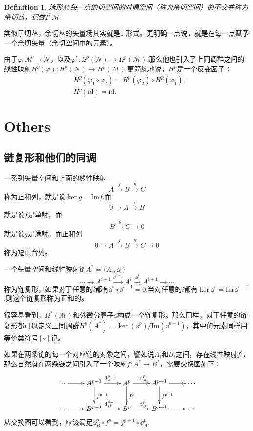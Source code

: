 \documentclass[11pt]{extbook}
\theoremstyle{plain}%
\newtheorem{defi}{Definition}[section]%
\begin{document}
\begin{defi}
流形$\mathcal{M}$每一点的切空间的对偶空间（称为余切空间）的不交并称为余切丛，记做$T^*\mathcal{M}$.
\end{defi}

类似于切丛，余切丛的矢量场其实就是1-形式。更明确一点说，就是在每一点赋予一个余切矢量（余切空间中的元素）。

由于$\varphi:\mathcal{M}\to\mathcal{N}$，以及$\varphi^*:\Omega^p(\mathcal{N})\to\Omega^p(\mathcal{M})$,那么他也引入了上同调群之间的线性映射$H^p(\varphi):H^p(\mathcal{N})\to H^p(\mathcal{M})$.更简练地说，$H^p$是一个反变函子：
\[
\begin{split}
&H^p(\varphi_1\circ\varphi_2)=H^p(\varphi_2)\circ H^p(\varphi_1),\\
&H^p(\mathrm{id})=\mathrm{id}.
\end{split}
\]

\chapter{Others}
\section{链复形和他们的同调}

一系列矢量空间和上面的线性映射
\[
A\xrightarrow{f}B\xrightarrow{g}C
\]
称为正和列，就是说$\ker g=\mathrm{Im} f$.而
\[
0\to A\xrightarrow{f}B
\]
就是说$f$是单射，而
\[
B\xrightarrow{g}C\to 0
\]
就是说$g$是满射。而正和列
\[
0\to A\xrightarrow{f}B\xrightarrow{g}C\to 0
\]
称为短正合列。

一个矢量空间和线性映射链$A^*=\{A_i,\dd_i\}$
\[
\cdots\to A^{i-1}\xrightarrow{\dd^{i-1}}A^i\xrightarrow{\dd^i}A^{i+1}\to \cdots
\]
称为链复形，如果对于任意的$i$都有$\dd^i \circ \dd^{i+1}=0$.当对任意的$i$都有$\ker \dd^i=\mathrm{Im}\, \dd^{i-1}$,则这个链复形称为正和的。

很容易看到，$\Omega^*(\mathcal{M})$和外微分算子$\dd$构成一个链复形。那么同样，对于任意的链复形都可以定义上同调群$H^p(A^*)=\ker (\dd^p)/\mathrm{Im} (\dd^{p-1})$，其中的元素同样用等价类符号$[a]$记。

如果在两条链的每一个对应链的对象之间，譬如说$A_i$和$B_i$之间，存在线性映射$f^i$，那么自然就在两条链之间引入了一个映射$f:A^*\to B^*$，需要交换图如下：
	\[
		\xymatrix{
\cdots\ar[r]&A^{p-1}\ar[r]^{\dd_A^{p-1}}\ar[d]^{f^{p-1}}&A^p\ar[r]^{\dd_A^p}\ar[d]^{f^{p}}&A^{p+1}\ar[r]\ar[d]^{f^{p+1}}&\cdots\\
\cdots\ar[r]&B^{p-1}\ar[r]^{\dd_B^{p-1}}&B^p\ar[r]^{\dd_B^p}&B^{p+1}\ar[r]&\cdots
		}
	\]
从交换图可以看到，应该满足$\dd^{p}_B\circ f^p=f^{p+1}\circ \dd^{p}_A$.
\end{document}
